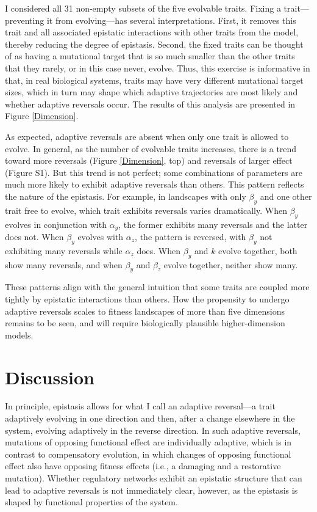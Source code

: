 \documentclass[dvips,12pt,twoside,titlepage]{article}
\begin{document}
I considered all 31 non-empty subsets of the five evolvable traits. 
Fixing a trait---preventing it from evolving---has several interpretations. 
First, it removes this trait and all associated epistatic interactions with other traits from the model, thereby reducing the degree of epistasis. 
Second, the fixed traits can be thought of as having a mutational target that is so much smaller than the other traits that they rarely, or in this case never, evolve.
Thus, this exercise is informative in that, in real biological systems, traits may have very different mutational target sizes, which in turn may shape which adaptive trajectories are most likely and whether adaptive reversals occur.
The results of this analysis are presented in Figure \ref{Dimension}.

As expected, adaptive reversals are absent when only one trait is allowed to evolve. 
In general, as the number of evolvable traits increases, there is a trend toward more reversals (Figure \ref{Dimension}, top) and reversals of larger effect (Figure S1). 
But this trend is not perfect; some combinations of parameters are much more likely to exhibit adaptive reversals than others. This pattern reflects the nature of the epistasis. 
For example, in landscapes with only $\beta_y$ and one other trait free to evolve, which trait exhibits reversals varies dramatically. 
When $\beta_y$ evolves in conjunction with $\alpha_y$, the former exhibits many reversals and the latter does not. 
When $\beta_y$ evolves with $\alpha_z$, the pattern is reversed, with $\beta_y$ not exhibiting many reversals while $\alpha_z$ does.
When $\beta_y$ and $k$ evolve together, both show many reversals, and when $\beta_y$ and $\beta_z$ evolve together, neither show many. 

These patterns align with the general intuition that some traits are coupled more tightly by epistatic interactions than others. 
How the propensity to undergo adaptive reversals scales to fitness landscapes of more than five dimensions remains to be seen, and will require biologically plausible higher-dimension models.

\section*{Discussion}

In principle, epistasis allows for what I call an adaptive reversal---a trait adaptively evolving in one direction and then, after a change elsewhere in the system, evolving adaptively in the reverse direction.
In such adaptive reversals, mutations of opposing functional effect are individually adaptive, which is in contrast to compensatory evolution, in which changes of opposing functional effect also have opposing fitness effects (i.e., a damaging and a restorative mutation).
Whether regulatory networks exhibit an epistatic structure that can lead to adaptive reversals is not immediately clear, however, as the epistasis is shaped by functional properties of the system.
\end{document}
